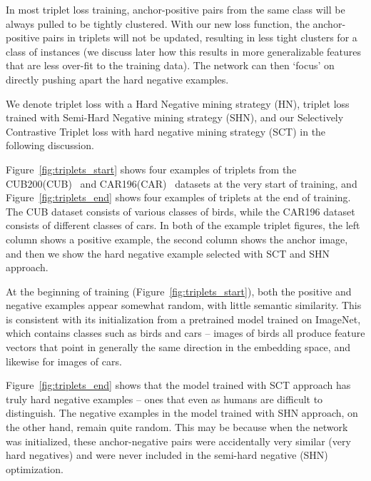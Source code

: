 \documentclass[runningheads]{llncs}
\begin{document}
In most triplet loss training, anchor-positive pairs from the same class will be always pulled to be tightly clustered. With our new loss function, the anchor-positive pairs in triplets will not be updated, resulting in less tight clusters for a class of instances (we discuss later how this results in more generalizable features that are less over-fit to the training data). The network can then `focus' on directly pushing apart the hard negative examples. 

We denote triplet loss with a Hard Negative mining strategy (HN), triplet loss trained with Semi-Hard Negative mining strategy (SHN), and our Selectively Contrastive Triplet loss with hard negative mining strategy (SCT) in the following discussion.

Figure~\ref{fig:triplets_start} shows four examples of triplets from the CUB200(CUB)~\cite{CUB200} and CAR196(CAR)~\cite{CAR196} datasets at the very start of training, and Figure~\ref{fig:triplets_end} shows four examples of triplets at the end of training. The CUB dataset consists of various classes of birds, while the CAR196 dataset consists of different classes of cars. In both of the example triplet figures, the left column shows a positive example, the second column shows the anchor image, and then we show the hard negative example selected with SCT and SHN approach.

At the beginning of training (Figure~\ref{fig:triplets_start}), both the positive and negative examples appear somewhat random, with little semantic similarity. This is consistent with its initialization from a pretrained model trained on ImageNet, which contains classes such as birds and cars -- images of birds all produce feature vectors that point in generally the same direction in the embedding space, and likewise for images of cars.

Figure~\ref{fig:triplets_end} shows that the model trained with SCT approach has truly hard negative examples -- ones that even as humans are difficult to distinguish. The negative examples in the model trained with SHN approach, on the other hand, remain quite random.  This may be because when the network was initialized, these anchor-negative pairs were accidentally very similar (very hard negatives) and were never included in the semi-hard negative (SHN) optimization.
\end{document}
